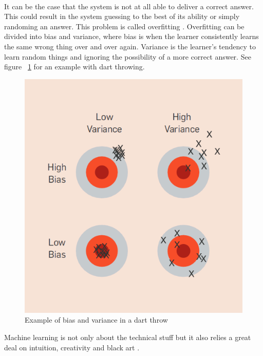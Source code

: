 \\[0.5cm]
It can be the case that the system is not at all able to deliver a correct answer. This could result in the system guessing to the best of its ability or simply randoming an answer. This problem is called overfitting \cite{18}. Overfitting can be divided into bias and variance, where bias is when the learner consistently learns the same wrong thing over and over again. Variance is the learner's tendency to learn random things and ignoring the possibility of a more correct answer. See figure ~\ref{fig:biasandvariance} for an example with dart throwing.
\begin{figure}[H]
\centering
\includegraphics[width=0.5\linewidth,natwidth=898,natheight=587]{billeder/biasVSvariance.png}
\caption{Example of bias and variance in a dart throw \cite{18}}
\label{fig:biasandvariance}
\end{figure}

Machine learning is not only about the technical stuff but it also relies a great deal on intuition, creativity and  black art \cite{18}. 
